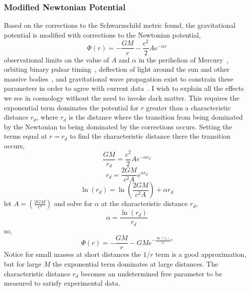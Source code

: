 \documentclass[aps,prd,preprint]{revtex4-1}
\begin{document}
\subsubsection*{Modified Newtonian Potential}
Based on the corrections to the Schwarzschild metric found, the gravitational potential is modified with corrections to the Newtonian potential,
\begin{equation}
    \Phi(r) = -\frac{GM}{r} - \frac{c^2}{2} A e^{-\alpha r}
\end{equation}
observational limits on the value of $A$ and $\alpha$ in the perihelion of Mercury~\cite{will_1993}, orbiting binary pulsar timing~\cite{lai_1995,wex_1998}, deflection of light around the sun and other massive bodies~\cite{will_1993}, and gravitational wave propagation exist to constrain these parameters in order to agree with current data~\cite{LIGO_2020,LIGO_2021_1,LIGO_2021_2}. I wish to explain all the effects we see in cosmology without the need to invoke dark matter. This requires the exponential term dominates the potential for $r$ greater than a characteristic distance $r_d$, where $r_d$ is the distance where the transition from being dominated by the Newtonian to being dominated by the corrections occurs. Setting the terms equal at $r = r_d$ to find the characteristic distance there the transition occurs,
\begin{equation}
    \frac{GM}{r_d} = \frac{c^2}{2} A e^{-\alpha r_d}
\end{equation}
\begin{equation}
    r_d = \frac{2GM}{c^2 A} e^{\alpha r_d}
\end{equation}
\begin{equation}
    \ln(r_d) = \ln\left( \frac{2GM}{c^2 A} \right) + \alpha r_d
\end{equation}
let $A = \left( \frac{2GM}{c^2} \right)$ and solve for $\alpha$ at the characteristic distance $r_d$,
\begin{equation}
    \alpha = \frac{\ln(r_d)}{r_d}
\end{equation}
so,
\begin{equation}
    \Phi(r) = -\frac{GM}{r} - G M e^{-\frac{\ln(r_d)}{r_d} r}
\end{equation}
Notice for small masses at short distances the $1/r$ term is a good approximation, but for large $M$ the exponential term dominates at large distances. The characteristic distance $r_d$ becomes an undetermined free parameter to be measured to satisfy experimental data.
\\
\end{document}
